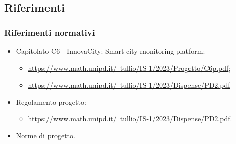 \subsection{Riferimenti}
\subsubsection{Riferimenti normativi}
\begin{itemize}
    \item Capitolato C6 - InnovaCity: Smart city monitoring platform:
    \begin{itemize}
        \item \href{https://www.math.unipd.it/~tullio/IS-1/2023/Progetto/C6.pdf}{https://www.math.unipd.it/~tullio/IS-1/2023/Progetto/C6p.pdf};
        \item \href{https://www.math.unipd.it/~tullio/IS-1/2023/Dispense/PD2.pdf}{https://www.math.unipd.it/~tullio/IS-1/2023/Dispense/PD2.pdf}
    \end{itemize}
    \item Regolamento progetto:
    \begin{itemize}
        \item \href{https://www.math.unipd.it/~tullio/IS-1/2023/Dispense/PD2.pdf}{https://www.math.unipd.it/~tullio/IS-1/2023/Dispense/PD2.pdf}.
    \end{itemize}
    \item Norme di progetto.
\end{itemize}
